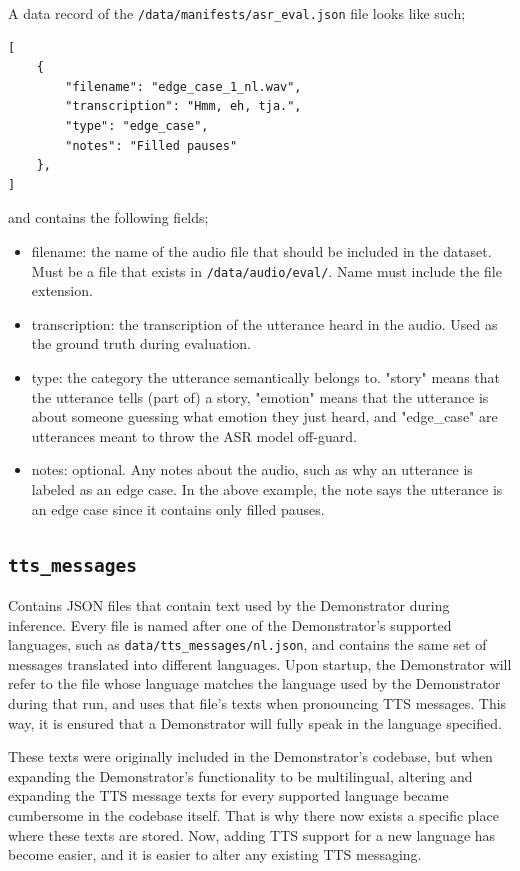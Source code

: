 A data record of the \texttt{/data/manifests/asr\_eval.json} file looks like such;
\begin{lstlisting}
[
    {
        "filename": "edge_case_1_nl.wav",
        "transcription": "Hmm, eh, tja.",
        "type": "edge_case",
        "notes": "Filled pauses"
    },
]
\end{lstlisting}
and contains the following fields;
\begin{itemize}
    \item filename: the name of the audio file that should be included in the dataset. Must be a file that exists in \texttt{/data/audio/eval/}. Name must include the file extension.
    \item transcription: the transcription of the utterance heard in the audio. Used as the ground truth during evaluation.
    \item type: the category the utterance semantically belongs to. "story" means that the utterance tells (part of) a story, "emotion" means that the utterance is about someone guessing what emotion they just heard, and "edge\_case" are utterances meant to throw the ASR model off-guard.
    \item notes: optional. Any notes about the audio, such as why an utterance is labeled as an edge case. In the above example, the note says the utterance is an edge case since it contains only filled pauses.
\end{itemize}

\subsection{\texttt{tts\_messages}}
Contains JSON files that contain text used by the Demonstrator during inference.
Every file is named after one of the Demonstrator's supported languages, such as \texttt{data/tts\_messages/nl.json}, and contains the same set of messages translated into different languages.
Upon startup, the Demonstrator will refer to the file whose language matches the language used by the Demonstrator during that run, and uses that file's texts when pronouncing TTS messages.
This way, it is ensured that a Demonstrator will fully speak in the language specified.

These texts were originally included in the Demonstrator's codebase, but when expanding the Demonstrator's functionality to be multilingual, altering and expanding the TTS message texts for every supported language became cumbersome in the codebase itself.
That is why there now exists a specific place where these texts are stored.
Now, adding TTS support for a new language has become easier, and it is easier to alter any existing TTS messaging.

